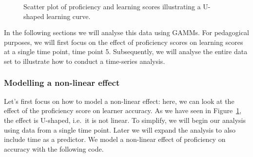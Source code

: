 \documentclass[
  letterpaper,
  DIV=11,
  numbers=noendperiod]{scrartcl}
\begin{document}
\begin{figure}


\caption{\label{fig-dat1}Scatter plot of proficiency and learning scores
illustrating a U-shaped learning curve.}

\end{figure}%

In the following sections we will analyse this data using GAMMs. For
pedagogical purposes, we will first focus on the effect of proficiency
scores on learning scores at a single time point, time point 5.
Subsequently, we will analyse the entire data set to illustrate how to
conduct a time-series analysis.

\subsubsection{Modelling a non-linear
effect}\label{modelling-a-non-linear-effect}

Let's first focus on how to model a non-linear effect: here, we can look
at the effect of the proficiency score on learner accuracy. As we have
seen in Figure~\ref{fig-dat1}, the effect is U-shaped, i.e.~it is not
linear. To simplify, we will begin our analysis using data from a single
time point. Later we will expand the analysis to also include time as a
predictor. We model a non-linear effect of proficiency on accuracy with
the following code.
\end{document}
